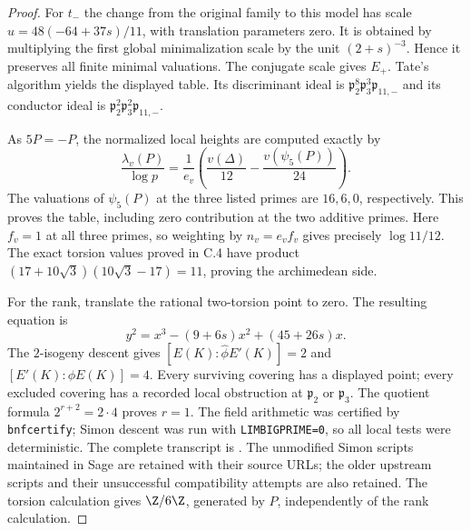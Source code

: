 \begin{proof}
For $t_-$ the change from the original family to this model
has scale $u=48(-64+37s)/11$, with translation parameters zero.
It is obtained by multiplying the first global minimalization
scale by the unit $(2+s)^{-3}$. Hence it preserves all finite
minimal valuations. The conjugate scale gives $E_+$.
Tate's algorithm yields the displayed table. Its discriminant
ideal is
$\mathfrak p_2^8\mathfrak p_3^3\mathfrak p_{11,-}$ and its
conductor ideal is
$\mathfrak p_2^2\mathfrak p_3^2\mathfrak p_{11,-}$.

As $5P=-P$, the normalized local heights are computed exactly by
\[
 \frac{\lambda_v(P)}{\log p}
 =\frac1{e_v}\left(\frac{v(\Delta)}{12}
                         -\frac{v(\psi_5(P))}{24}\right).
\]
The valuations of $\psi_5(P)$ at the three listed primes are
$16,6,0$, respectively. This proves the table, including zero
contribution at the two additive primes. Here $f_v=1$ at all
three primes, so weighting by $n_v=e_vf_v$ gives precisely
$\log11/12$. The exact torsion values proved in C.4 have product
$(17+10\sqrt3)(10\sqrt3-17)=11$, proving the archimedean side.

For the rank, translate the rational two-torsion point to zero.
The resulting equation is
\[
 y^2=x^3-(9+6s)x^2+(45+26s)x.
\]
The $2$-isogeny descent gives
$[E(K):\widehat\phi E'(K)]=2$ and
$[E'(K):\phi E(K)]=4$. Every surviving covering has a
displayed point; every excluded covering has a recorded local
obstruction at $\mathfrak p_2$ or $\mathfrak p_3$.
The quotient formula $2^{r+2}=2\cdot4$ proves $r=1$.
The field arithmetic was certified by \texttt{bnfcertify};
Simon descent was run with \texttt{LIMBIGPRIME=0}, so all local
tests were deterministic. The complete transcript is
. The unmodified
Simon scripts maintained in Sage are retained with their source
URLs; the older upstream scripts and their unsuccessful
compatibility attempts are also retained. The torsion calculation
gives $\Z/6\Z$, generated by $P$, independently of the rank
calculation.
\end{proof}

